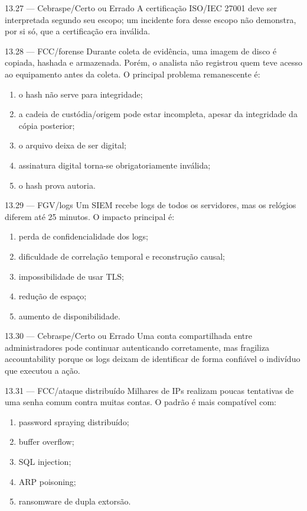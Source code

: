 \begin{questao}{ 13.27 — Cebraspe/Certo ou Errado}
A certificação ISO/IEC 27001 deve ser interpretada segundo seu escopo; um incidente fora desse escopo não demonstra, por si só, que a certificação era inválida.
\end{questao}

\begin{questao}{ 13.28 — FCC/forense}
Durante coleta de evidência, uma imagem de disco é copiada, hashada e armazenada. Porém, o analista não registrou quem teve acesso ao equipamento antes da coleta. O principal problema remanescente é:
\begin{enumerate}[label=\Alph*)]
\item o hash não serve para integridade;
\item a cadeia de custódia/origem pode estar incompleta, apesar da integridade da cópia posterior;
\item o arquivo deixa de ser digital;
\item assinatura digital torna-se obrigatoriamente inválida;
\item o hash prova autoria.
\end{enumerate}
\end{questao}

\begin{questao}{ 13.29 — FGV/logs}
Um SIEM recebe logs de todos os servidores, mas os relógios diferem até 25 minutos. O impacto principal é:
\begin{enumerate}[label=\Alph*)]
\item perda de confidencialidade dos logs;
\item dificuldade de correlação temporal e reconstrução causal;
\item impossibilidade de usar TLS;
\item redução de espaço;
\item aumento de disponibilidade.
\end{enumerate}
\end{questao}

\begin{questao}{ 13.30 — Cebraspe/Certo ou Errado}
Uma conta compartilhada entre administradores pode continuar autenticando corretamente, mas fragiliza accountability porque os logs deixam de identificar de forma confiável o indivíduo que executou a ação.
\end{questao}

\begin{questao}{ 13.31 — FCC/ataque distribuído}
Milhares de IPs realizam poucas tentativas de uma senha comum contra muitas contas. O padrão é mais compatível com:
\begin{enumerate}[label=\Alph*)]
\item password spraying distribuído;
\item buffer overflow;
\item SQL injection;
\item ARP poisoning;
\item ransomware de dupla extorsão.
\end{enumerate}
\end{questao}

